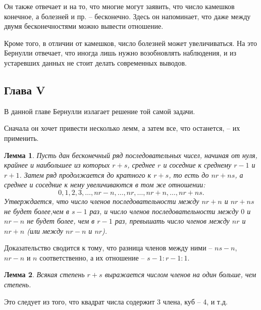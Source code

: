 \documentclass[12pt]{extarticle}
\newtheorem{lemma}{Лемма}
\begin{document}
Он также отвечает и на то, что многие могут заявить, что число камешков конечное, а болезней и пр. -- бесконечно.
Здесь он напоминает, что даже между двумя бесконечностями можно вывести отношение.

Кроме того, в отличии от камешков, число болезней может увеличиваться.
На это Бернулли отвечает, что иногда лишь нужно возобновлять наблюдения, и из устаревших данных не стоит делать современных выводов.


\subsection{Глава V}
В данной главе Бернулли излагает решение той самой задачи.

Сначала он хочет привести несколько лемм, а затем все, что останется, -- их применить.
\begin{lemma} \label{lem1}
Пусть дан бесконечный ряд последовательных чисел, начиная от нуля, крайнее и наибольшее из которых $r+s$, среднее $r$ и соседние к среднему $r - 1$ и $r+1$. 
Затем ряд продолжается до кратного к $r+s$, то есть до $nr+ns$, а среднее и соседние к нему увеличиваются в том же отношении:
$$0, 1, 2, 3, \dots, nr-n, \dots, nr, \dots, nr+n, \dots, nr+ns.$$
Утверждается, что число членов последовательности между $nr+n$ и $nr+ns$ не будет более,чем в $s-1$ раз, и число членов последовательности между $0$ и $nr-n$ не будет более, чем в $r-1$ раз, превышать число членов между $nr$ и $nr+n$ (или между $nr-n$ и $nr$).
\end{lemma}
Доказательство сводится к тому, что разница членов между ними -- $ns-n$, $nr-n$ и $n$ соответственно, а их отношение -- $s-1 : r-1 : 1$.

\begin{lemma} \label{lem2}
Всякая степень $r+s$ выражается числом членов на один больше, чем степень.
\end{lemma}
Это следует из того, что квадрат числа содержит 3 члена, куб -- 4, и т.д.
 
\end{document}
